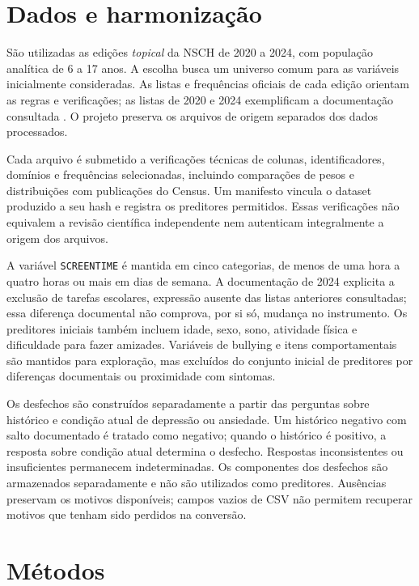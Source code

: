 \documentclass[12pt]{article}
\begin{document}
\section{Dados e harmonização}
São utilizadas as edições \textit{topical} da NSCH de 2020 a 2024, com população analítica de 6 a 17 anos. A escolha busca um universo comum para as variáveis inicialmente consideradas. As listas e frequências oficiais de cada edição orientam as regras e verificações; as listas de 2020 e 2024 exemplificam a documentação consultada \cite{census2020,census2024}. O projeto preserva os arquivos de origem separados dos dados processados.

Cada arquivo é submetido a verificações técnicas de colunas, identificadores, domínios e frequências selecionadas, incluindo comparações de pesos e distribuições com publicações do Census. Um manifesto vincula o dataset produzido a seu hash e registra os preditores permitidos. Essas verificações não equivalem a revisão científica independente nem autenticam integralmente a origem dos arquivos.

A variável \texttt{SCREENTIME} é mantida em cinco categorias, de menos de uma hora a quatro horas ou mais em dias de semana. A documentação de 2024 explicita a exclusão de tarefas escolares, expressão ausente das listas anteriores consultadas; essa diferença documental não comprova, por si só, mudança no instrumento. Os preditores iniciais também incluem idade, sexo, sono, atividade física e dificuldade para fazer amizades. Variáveis de bullying e itens comportamentais são mantidos para exploração, mas excluídos do conjunto inicial de preditores por diferenças documentais ou proximidade com sintomas.

Os desfechos são construídos separadamente a partir das perguntas sobre histórico e condição atual de depressão ou ansiedade. Um histórico negativo com salto documentado é tratado como negativo; quando o histórico é positivo, a resposta sobre condição atual determina o desfecho. Respostas inconsistentes ou insuficientes permanecem indeterminadas. Os componentes dos desfechos são armazenados separadamente e não são utilizados como preditores. Ausências preservam os motivos disponíveis; campos vazios de CSV não permitem recuperar motivos que tenham sido perdidos na conversão.

\section{Métodos}
\end{document}
